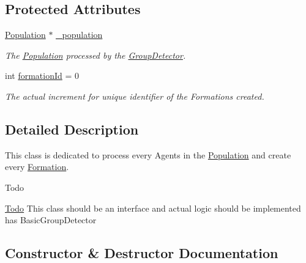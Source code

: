 \subsection*{Protected Attributes}
\begin{DoxyCompactItemize}
\item 
\hyperlink{classPopulation}{Population} $\ast$ \hyperlink{classGroupDetector_a773ce547e63eac75d32d964d70180cd9}{\+\_\+population}\hypertarget{classGroupDetector_a773ce547e63eac75d32d964d70180cd9}{}\label{classGroupDetector_a773ce547e63eac75d32d964d70180cd9}

\begin{DoxyCompactList}\small\item\em The \hyperlink{classPopulation}{Population} processed by the \hyperlink{classGroupDetector}{Group\+Detector}. \end{DoxyCompactList}\item 
int \hyperlink{classGroupDetector_a2cb0f3a229ac96d133f657e306d5d685}{formation\+Id} = 0\hypertarget{classGroupDetector_a2cb0f3a229ac96d133f657e306d5d685}{}\label{classGroupDetector_a2cb0f3a229ac96d133f657e306d5d685}

\begin{DoxyCompactList}\small\item\em The actual increment for unique identifier of the Formations created. \end{DoxyCompactList}\end{DoxyCompactItemize}


\subsection{Detailed Description}
This class is dedicated to process every Agents in the \hyperlink{classPopulation}{Population} and create every \hyperlink{classFormation}{Formation}. 

\begin{DoxyRefDesc}{Todo}
\item[\hyperlink{todo__todo000002}{Todo}]This class should be an interface and actual logic should be implemented has Basic\+Group\+Detector \end{DoxyRefDesc}


\subsection{Constructor \& Destructor Documentation}

